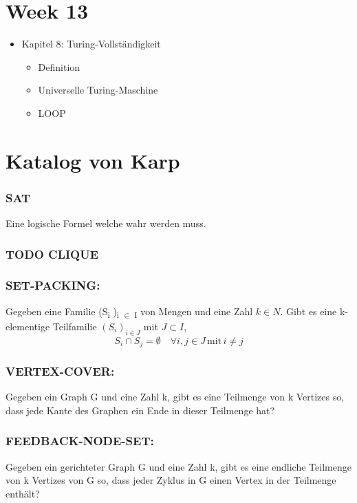 \documentclass[11pt,twoside,landscape]{article}
\begin{document}
\begin{multicols}{3}
\section*{Week 13}
\label{sec:org7196652}
\begin{itemize}
\item Kapitel 8: Turing-Vollständigkeit

\begin{itemize}
\item Definition
\item Universelle Turing-Maschine
\item LOOP
\end{itemize}
\end{itemize}




\newpage
\section*{Katalog von Karp}
\label{sec:org9de6dfa}
\subsubsection*{SAT}
\label{sec:orgddbbb97}
Eine logische Formel welche wahr werden muss.

\subsubsection*{{\bfseries\sffamily TODO} CLIQUE}
\label{sec:org719b9ff}
\subsubsection*{SET-PACKING:}
\label{sec:org1a965eb}
Gegeben eine Familie (S\textsubscript{i} )\textsubscript{i \(\in\) I} von Mengen und eine Zahl \(k \in N\). Gibt es eine k-elementige Teilfamilie \((S_i)_{i \in J}\) mit \(J \subset I\),
$$
S_i \cap S_j = \emptyset \quad \forall i, j \in J \, \text{mit} \, i \neq j
$$

\subsubsection*{VERTEX-COVER:}
\label{sec:org176373b}
Gegeben ein Graph G und eine Zahl k, gibt es eine Teilmenge von k Vertizes so, dass jede Kante des Graphen ein Ende in dieser Teilmenge hat?

\subsubsection*{FEEDBACK-NODE-SET:}
\label{sec:org0c86b0d}
Gegeben ein gerichteter Graph G und eine Zahl k, gibt es eine endliche Teilmenge von k Vertizes von G so, dass jeder Zyklus in G einen Vertex in der Teilmenge enthält?


\end{multicols}
\end{document}
